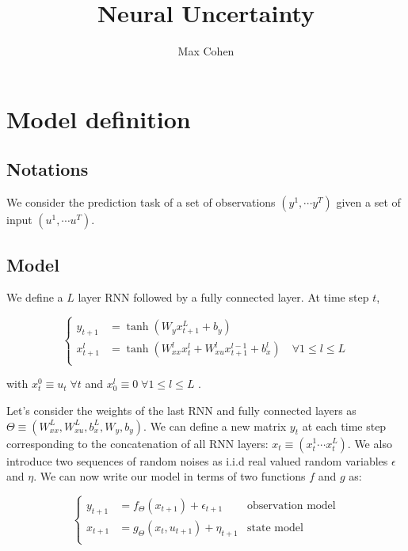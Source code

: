 \documentclass[10pt,a4paper]{report}
\begin{document}
\title{Neural Uncertainty}
\author{Max Cohen}

\chapter{Model definition}
\section{Notations}
We consider the prediction task of a set of observations $(y^1, \cdots y^T)$ given a set of input $(u^1, \cdots u^T)$.

\section{Model}
We define a $L$ layer RNN followed by a fully connected layer. At time step $t$,

\begin{equation*}
    \left\{
    \begin{aligned}
        y_{t+1}   & = \tanh(W_y x_{t+1}^L + b_y)                                                               \\
        x_{t+1}^l & = \tanh(W_{xx}^l x^{l}_{t} + W_{xu}^l x^{l-1}_{t+1} + b_x^l) \quad \forall 1 \leq l \leq L \\
    \end{aligned}
    \right.
\end{equation*}

with $x_{t}^0 \equiv u_{t} \; \forall t$ and $x_{0}^l \equiv 0 \; \forall 1 \leq l \leq L$ .

Let's consider the weights of the last RNN and fully connected layers as $\Theta \equiv (W_{xx}^L, W_{xu}^L, b_x^L, W_y, b_y)$. We can define a new matrix $y_t$ at each time step corresponding to the concatenation of all RNN layers: $x_t \equiv (x_t^1 \cdots x_t^L)$. We also introduce two sequences of random noises as i.i.d real valued random variables $\epsilon$ and $\eta$. We can now write our model in terms of two functions $f$ and $g$ as:

\begin{equation}
    \left\{
    \begin{aligned}
        y_{t+1} & = f_\Theta(x_{t+1}) + \epsilon_{t+1}    & \text{observation model} \\
        x_{t+1} & = g_\Theta(x_{t}, u_{t+1}) + \eta_{t+1} & \text{state model}       \\
    \end{aligned}
    \right.
\end{equation}
\end{document}
